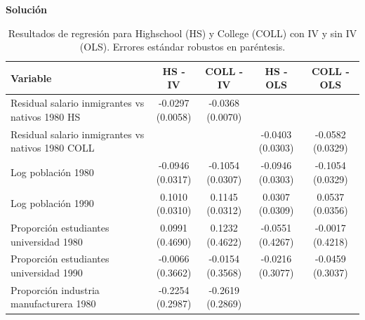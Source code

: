 \documentclass[a4paper, answers, addpoints, 11pt]{exam}
\newenvironment{solucion}{%
  \begin{mdframed}[
    backgroundcolor=blue!5,    %
    linecolor=blue!50,          %
    linewidth=2pt,              %
    leftmargin=10pt,            %
    rightmargin=8pt,           %
    topline=true,              %
    bottomline=true,            %
    roundcorner=10pt,           %
    innerleftmargin=10pt,       %
    innerrightmargin=10pt,      %
    innerbottommargin=10pt,     %
    innertopmargin=10pt         %
  ]%
  \begin{tcolorbox}[colframe=blue!50!black, colback=blue!50, coltitle=white, sharp corners=all, boxrule=1mm, width=\textwidth, halign=left, valign=center, top=0mm, bottom=0mm, left=0mm, right=0mm] \textbf{Solución} \end{tcolorbox} }{\end{mdframed}}
\begin{document}
\begin{itemize}
\begin{itemize}
\begin{solucion}
\begin{table}[H]
\centering
\small
\caption{Resultados de regresión para Highschool (HS) y College (COLL) con IV y sin IV (OLS). Errores estándar robustos en paréntesis.}
\label{tab:resultados}
\begin{tabular}{p{5cm}cccc}
\hline
\textbf{Variable} & \textbf{HS - IV} & \textbf{COLL - IV} & \textbf{HS - OLS} & \textbf{COLL - OLS} \\
\hline
Residual salario inmigrantes vs nativos 1980 HS 
& \makecell{-0.0297 \\ (0.0058)} 
& \makecell{-0.0368 \\ (0.0070)} 
& 
& 
\\
Residual salario inmigrantes vs nativos 1980 COLL 
& 
& 
& \makecell{-0.0403 \\ (0.0303)} 
& \makecell{-0.0582 \\ (0.0329)} 
\\
Log población 1980 
& \makecell{-0.0946 \\ (0.0317)} 
& \makecell{-0.1054 \\ (0.0307)} 
& \makecell{-0.0946 \\ (0.0303)} 
& \makecell{-0.1054 \\ (0.0329)} 
\\
Log población 1990 
& \makecell{0.1010 \\ (0.0310)} 
& \makecell{0.1145 \\ (0.0312)} 
& \makecell{0.0307 \\ (0.0309)} 
& \makecell{0.0537 \\ (0.0356)} 
\\
Proporción estudiantes universidad 1980 
& \makecell{0.0991 \\ (0.4690)} 
& \makecell{0.1232 \\ (0.4622)} 
& \makecell{-0.0551 \\ (0.4267)} 
& \makecell{-0.0017 \\ (0.4218)} 
\\
Proporción estudiantes universidad 1990 
& \makecell{-0.0066 \\ (0.3662)} 
& \makecell{-0.0154 \\ (0.3568)} 
& \makecell{-0.0216 \\ (0.3077)} 
& \makecell{-0.0459 \\ (0.3037)} 
\\
Proporción industria manufacturera 1980 
& \makecell{-0.2254 \\ (0.2987)} 
& \makecell{-0.2619 \\ (0.2869)} 

\end{tabular}
\end{table}
\end{solucion}
\end{itemize}
\end{itemize}
\end{document}
